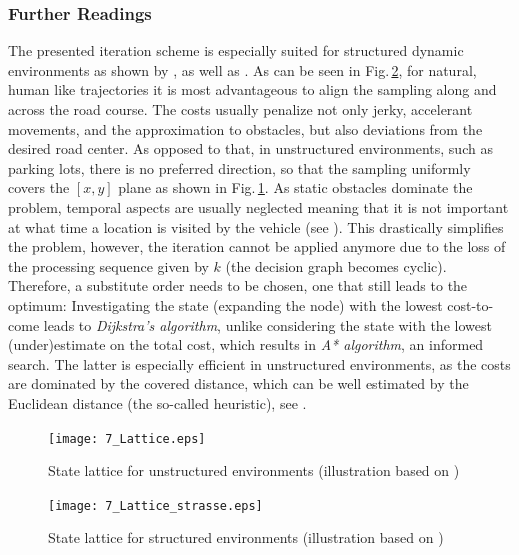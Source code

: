 \subsubsection{Further Readings}\label{S:57.3.3.4}
The presented iteration scheme is especially suited for structured dynamic environments as shown by \cite{zieg09spatemp, McNaughton2011diss},
as well as \cite{Gu2012}.
As can be seen in Fig.\,\ref{fig:lattice_strasse}, for natural, human like trajectories it is most advantageous to align the sampling along and across the road course. The costs usually penalize not only jerky, accelerant movements, and the approximation to obstacles, but also deviations from the desired road center. 
As opposed to that, in unstructured environments, such as parking lots, there is no preferred direction, so that the sampling uniformly covers the $[x,y]$ plane as shown in  Fig.\,\ref{fig:lattice}. 
As static obstacles dominate the problem, temporal aspects are usually neglected meaning that it is not important at what time a location is visited by the vehicle (see \cite{montemerlo2008junior, zieglerIV08, pivtoraiko2009differentially, likhachev2009planning, dolgov2010path}).
This drastically simplifies the problem, however, the iteration cannot be applied anymore due to the loss of the processing sequence given by $k$ (the decision graph becomes cyclic). Therefore, a substitute order needs to be chosen, one that still leads to the optimum: Investigating the state (expanding the node) with the lowest cost-to-come leads to \emph{Dijkstra's algorithm}, unlike considering the state with the lowest (under)estimate on the total cost, which results in \emph{A* algorithm}, an informed search.
 The latter is especially efficient in unstructured environments, as the costs are dominated by the covered distance, which can be well estimated by the Euclidean distance (the so-called heuristic), see \cite{bertsekas2007}.


\begin{figure}[h]
\centering
  	\texttt{[image: 7\_Lattice.eps]}
	\caption[State lattice for unstructured environments]{State lattice for unstructured environments (illustration based on \cite{mcnaughton})}
	\label{fig:lattice}
\end{figure}


\begin{figure}[h]
\centering
  	\texttt{[image: 7\_Lattice\_strasse.eps]}
	\caption[State lattice for structured environments]{State lattice for structured environments (illustration based on \cite{McNaughton2011diss})}
	\label{fig:lattice_strasse}
\end{figure}



